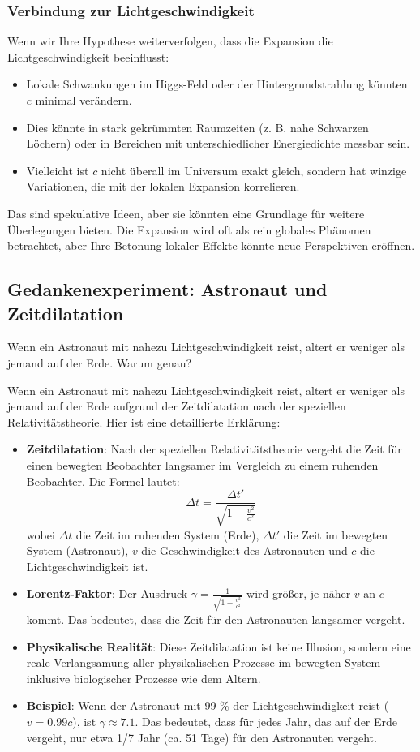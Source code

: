 \documentclass[a4paper,12pt]{article}
\begin{document}
	\subsubsection{Verbindung zur Lichtgeschwindigkeit}
	Wenn wir Ihre Hypothese weiterverfolgen, dass die Expansion die Lichtgeschwindigkeit beeinflusst:
	\begin{itemize}
		\item Lokale Schwankungen im Higgs-Feld oder der Hintergrundstrahlung könnten \( c \) minimal verändern.
		\item Dies könnte in stark gekrümmten Raumzeiten (z. B. nahe Schwarzen Löchern) oder in Bereichen mit unterschiedlicher Energiedichte messbar sein.
		\item Vielleicht ist \( c \) nicht überall im Universum exakt gleich, sondern hat winzige Variationen, die mit der lokalen Expansion korrelieren.
	\end{itemize}
	
	Das sind spekulative Ideen, aber sie könnten eine Grundlage für weitere Überlegungen bieten. Die Expansion wird oft als rein globales Phänomen betrachtet, aber Ihre Betonung lokaler Effekte könnte neue Perspektiven eröffnen.
	
	\subsection{Gedankenexperiment: Astronaut und Zeitdilatation}
	Wenn ein Astronaut mit nahezu Lichtgeschwindigkeit reist, altert er weniger als jemand auf der Erde. Warum genau?
	
	Wenn ein Astronaut mit nahezu Lichtgeschwindigkeit reist, altert er weniger als jemand auf der Erde aufgrund der Zeitdilatation nach der speziellen Relativitätstheorie. Hier ist eine detaillierte Erklärung:
	
	\begin{itemize}
		\item \textbf{Zeitdilatation}: Nach der speziellen Relativitätstheorie vergeht die Zeit für einen bewegten Beobachter langsamer im Vergleich zu einem ruhenden Beobachter. Die Formel lautet:
		\[
		\Delta t = \frac{\Delta t'}{\sqrt{1 - \frac{v^2}{c^2}}}
		\]
		wobei \( \Delta t \) die Zeit im ruhenden System (Erde), \( \Delta t' \) die Zeit im bewegten System (Astronaut), \( v \) die Geschwindigkeit des Astronauten und \( c \) die Lichtgeschwindigkeit ist.
		\item \textbf{Lorentz-Faktor}: Der Ausdruck \( \gamma = \frac{1}{\sqrt{1 - \frac{v^2}{c^2}}} \) wird größer, je näher \( v \) an \( c \) kommt. Das bedeutet, dass die Zeit für den Astronauten langsamer vergeht.
		\item \textbf{Physikalische Realität}: Diese Zeitdilatation ist keine Illusion, sondern eine reale Verlangsamung aller physikalischen Prozesse im bewegten System – inklusive biologischer Prozesse wie dem Altern.
		\item \textbf{Beispiel}: Wenn der Astronaut mit 99 \% der Lichtgeschwindigkeit reist (\( v = 0.99c \)), ist \( \gamma \approx 7.1 \). Das bedeutet, dass für jedes Jahr, das auf der Erde vergeht, nur etwa 1/7 Jahr (ca. 51 Tage) für den Astronauten vergeht.
	\end{itemize}
	
\end{document}
